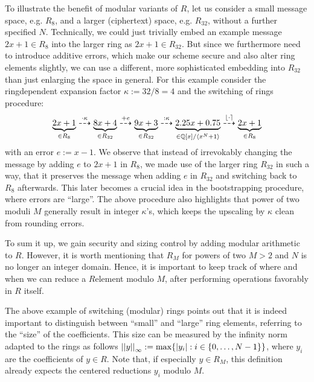 \documentclass[letterpaper,10pt,english]{jupyterBook}
\begin{document}
\sphinxAtStartPar
To illustrate the benefit of modular variants of \(R\), let us consider a small message space, e.g. \(R_8\), and a larger (ciphertext) space, e.g. \(R_{32}\), without a further specified \(N\).
Technically, we could just trivially embed an example message \(2x+1 \in R_8\) into the larger ring as \(2x+1 \in R_{32}\).
But since we furthermore need to introduce additive errors, which make our scheme secure and also alter ring elements slightly, we can use a different, more sophisticated embedding into \(R_{32}\) than just enlarging the space in general.
For this example consider the ring\sphinxhyphen{}dependent expansion factor \(\kappa := 32/8 = 4\) and the switching of rings procedure:
\begin{equation*}
\begin{split}\underbrace{2x+1}_{\in R_8} \overset{\cdot \kappa}{\dashrightarrow} \underbrace{8x+4}_{\in R_{32}} \overset{+ e }{\dashrightarrow} \underbrace{9x+3}_{\in R_{32}} \overset{: \kappa}{\dashrightarrow} \underbrace{2.25 x + 0.75}_{\in\mathbb Q[x]/\langle x^N+1 \rangle} \overset{\left\lfloor \cdot \right\rceil}{\dashrightarrow} \underbrace{2x+1}_{\in R_8}\end{split}
\end{equation*}
\sphinxAtStartPar
with an error \(e := x-1\).
We observe that instead of irrevokably changing the message by adding \(e\) to \(2x+1\) in \(R_8\), we made use of the larger ring \(R_{32}\) in such a way, that it preserves the message when adding \(e\) in \(R_{32}\) and switching back to \(R_8\) afterwards.
This later becomes a crucial idea in the bootstrapping procedure, where errors are “large”.
The above procedure also highlights that power of two moduli \(M\) generally result in integer \(\kappa\)’s, which keeps the upscaling by \(\kappa\) clean from rounding errors.

\sphinxAtStartPar
To sum it up, we gain security and sizing control by adding modular arithmetic to \(R\).
However, it is worth mentioning that \(R_M\) for powers of two \(M>2\) and \(N\) is no longer an integer domain.
Hence, it is important to keep track of where and when we can reduce a \(R\)\sphinxhyphen{}element modulo \(M\), after performing operations favorably in \(R\) itself.

\begin{DUlineblock}{0em}
\item[] 
\end{DUlineblock}

\sphinxAtStartPar
The above example of switching (modular) rings points out that it is indeed important to distinguish between “small” and “large” ring elements, referring to the “size” of the coefficients.
This size can be measured by the infinity norm adapted to the rings as follows \(\left\lvert\left\lvert y \right\rvert\right\rvert_\infty := \max \{|y_i| : i \in \{0,\dots,N-1\}\}\), where \(y_i\) are the coefficients of \(y \in R\).
Note that, if especially \(y \in R_M\), this definition already expects the centered reductions \(y_i\) modulo \(M\).
\end{document}
